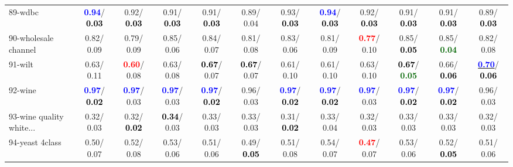 \begin{table}[h]
\begin{center}
{\begin{tabular}{lc|c|c|c|c|c|c|c|c|c|c}
89-wdbc & \textcolor{blue}{\textbf{  0.94}}/\textcolor{black}{\textbf{  0.03}} &   0.92/\textcolor{black}{\textbf{  0.03}} &   0.91/\textcolor{black}{\textbf{  0.03}} &   0.91/\textcolor{black}{\textbf{  0.03}} &   0.89/  0.04 &   0.93/\textcolor{black}{\textbf{  0.03}} & \textcolor{blue}{\textbf{  0.94}}/\textcolor{black}{\textbf{  0.03}} &   0.92/\textcolor{black}{\textbf{  0.03}} &   0.91/\textcolor{black}{\textbf{  0.03}} &   0.91/\textcolor{black}{\textbf{  0.03}} &   0.89/\textcolor{black}{\textbf{  0.03}} \\
90-wholesale channel &   0.82/  0.09 &   0.79/  0.09 &   0.85/  0.06 &   0.84/  0.07 &   0.81/  0.08 &   0.83/  0.06 &   0.81/  0.09 & \textcolor{red}{\textbf{  0.77}}/  0.10 &   0.85/\textcolor{black}{\textbf{  0.05}} &   0.85/\textcolor{darkgreen}{\textbf{  0.04}} &   0.82/  0.08 \\
91-wilt &   0.63/  0.11 & \textcolor{red}{\textbf{  0.60}}/  0.08 &   0.63/  0.08 & \textcolor{black}{\textbf{  0.67}}/  0.07 & \textcolor{black}{\textbf{  0.67}}/  0.07 &   0.61/  0.10 &   0.61/  0.10 &   0.63/  0.10 & \textcolor{black}{\textbf{  0.67}}/\textcolor{darkgreen}{\textbf{  0.05}} &   0.66/\textcolor{black}{\textbf{  0.06}} & \underline{\textcolor{blue}{\textbf{  0.70}}}/\textcolor{black}{\textbf{  0.06}} \\
92-wine & \textcolor{blue}{\textbf{  0.97}}/\textcolor{black}{\textbf{  0.02}} & \textcolor{blue}{\textbf{  0.97}}/  0.03 & \textcolor{blue}{\textbf{  0.97}}/  0.03 & \textcolor{blue}{\textbf{  0.97}}/\textcolor{black}{\textbf{  0.02}} &   0.96/  0.03 & \textcolor{blue}{\textbf{  0.97}}/\textcolor{black}{\textbf{  0.02}} & \textcolor{blue}{\textbf{  0.97}}/\textcolor{black}{\textbf{  0.02}} & \textcolor{blue}{\textbf{  0.97}}/  0.03 & \textcolor{blue}{\textbf{  0.97}}/\textcolor{black}{\textbf{  0.02}} & \textcolor{blue}{\textbf{  0.97}}/\textcolor{black}{\textbf{  0.02}} &   0.96/  0.03 \\ \hline
93-wine quality white... &   0.32/  0.03 &   0.32/\textcolor{black}{\textbf{  0.02}} & \textcolor{black}{\textbf{  0.34}}/  0.03 &   0.33/  0.03 &   0.33/  0.03 &   0.31/\textcolor{black}{\textbf{  0.02}} &   0.33/  0.04 &   0.32/  0.03 &   0.33/  0.03 &   0.33/  0.03 &   0.32/  0.03 \\
94-yeast 4class &   0.50/  0.07 &   0.52/  0.08 &   0.53/  0.06 &   0.51/  0.06 &   0.49/\textcolor{black}{\textbf{  0.05}} &   0.51/  0.08 &   0.54/  0.07 & \textcolor{red}{\textbf{  0.47}}/  0.07 &   0.53/  0.06 &   0.52/\textcolor{black}{\textbf{  0.05}} &   0.51/  0.06 \\\end{tabular}}\label{stratsBalAcc2bNB}
\end{center}
\end{table}